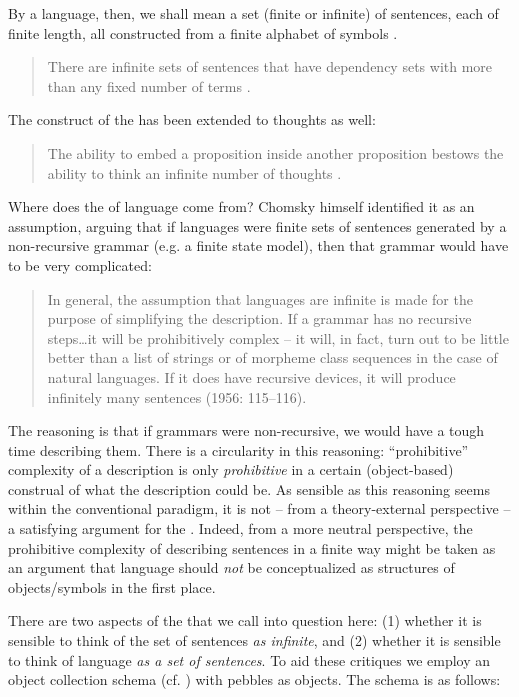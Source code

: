 By a language, then, we shall mean a set (finite or infinite) of sentences, each of finite length, all constructed from a finite alphabet of symbols \citep[114]{Chomsky1956}.

\begin{quote}
    There are infinite sets of sentences that have dependency sets with more than any fixed number of terms \citep[115]{Chomsky1956}. 
    \end{quote}

The construct of the  has been extended to thoughts as well:

\begin{quote}
The ability to embed a proposition inside another proposition bestows the ability to think an infinite number of thoughts \citep[125]{Pinker1999}. 
\end{quote}

  Where does the  of language come from? Chomsky himself identified it as an assumption, arguing that if languages were finite sets of sentences generated by a non-recursive grammar (e.g. a finite state model), then that grammar would have to be very complicated:
  
\begin{quote}
In general, the assumption that languages are infinite is made for the purpose of simplifying the description. If a grammar has no recursive steps\ldots it will be prohibitively complex -- it will, in fact, turn out to be little better than a list of strings or of morpheme class sequences in the case of natural languages. If it does have recursive devices, it will produce infinitely many sentences (1956: 115--116).
\end{quote}

  The reasoning is that if grammars were non-recursive, we would have a tough time describing them. There is a circularity in this reasoning: “prohibitive” complexity of a description is only \textit{prohibitive} in a certain (object-based) construal of what the description could be. As sensible as this reasoning seems within the conventional paradigm, it is not -- from a theory-external perspective -- a satisfying argument for the . Indeed, from a more neutral perspective, the prohibitive complexity of describing sentences in a finite way might be taken as an argument that language should \textit{not} be conceptualized as structures of objects/symbols in the first place.

  There are two aspects of the  that we call into question here: 
  (1) whether it is sensible to think of the set of sentences \textit{as infinite}, and 
  (2) whether it is sensible to think of language \textit{as a set of sentences}. To aid these critiques we employ an object collection schema (cf. \citealt{LakoffNúñez2000}) with pebbles as objects. The schema is as follows: 

